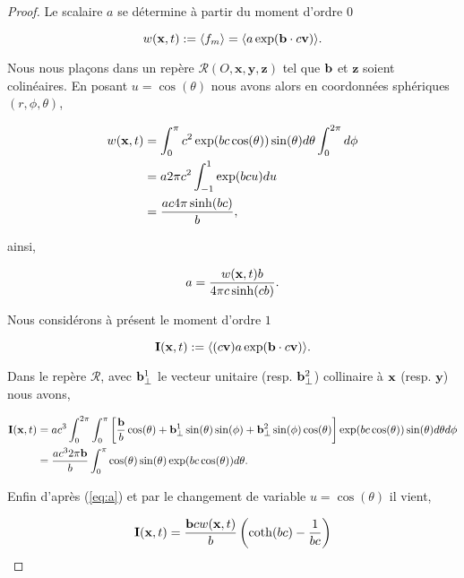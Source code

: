 \begin{proof}

  Le scalaire $a$ se détermine à partir du moment d'ordre $0$

  $$
    w(\mathbf{x},t) := \langle f_m \rangle = \langle a \exp( \mathbf{b} \cdot c\mathbf{v}) \rangle.
  $$

  Nous nous plaçons dans un repère $\mathcal{R}(O,\mathbf{x},\mathbf{y},\mathbf{z})$ 
  tel que $\mathbf{b}$ et $\mathbf{z}$ soient colinéaires. En posant $u = \cos(\theta)$ 
  nous avons alors en coordonnées sphériques $(r,\phi,\theta)$,

  \begin{equation}
    \begin{aligned}
    w(\mathbf{x},t) &= \int_0^\pi c^2\exp(b c\cos(\theta)) 
    \sin(\theta) d\theta \int_0^{2\pi} d\phi \\ 
    &= a 2\pi c^2  \int_{-1}^1 \exp(bcu)du\\
    &=  \frac{a c 4\pi \sinh(bc)}{b},
    \end{aligned}
  \end{equation}

  ainsi,

  \begin{equation}
    \label{eq:a}
    a = \frac{w(\mathbf{x},t) b}{4 \pi c \sinh(cb)}.
  \end{equation}


  Nous considérons à présent le moment d'ordre $1$

  $$
  \mathbf{I}(\mathbf{x},t) :=  \langle   (c \mathbf{v}) a\exp(\mathbf{b} \cdot c\mathbf{v})  \rangle.
  $$

  Dans le repère $\mathcal{R}$, avec $\mathbf{b}_{\perp}^1$ le vecteur unitaire
  (resp. $\mathbf{b}_{\perp}^2$) collinaire à $\mathbf{x}$ (resp. $\mathbf{y}$) nous avons,
  
  \begin{equation}
    \begin{aligned}
    \mathbf{I}(\mathbf{x},t) &=a c^3\int_0^{2 \pi} \int_0^\pi  \left[  \frac{\mathbf{b}}{b} \cos(\theta) 
    + \mathbf{b}_{\perp}^1 \sin(\theta) \sin(\phi) 
    + \mathbf{b}_{\perp}^2 \sin(\phi) \cos(\theta)\right]\exp(bc\cos(\theta)) 
    \sin(\theta) d \theta d \phi \\
    & = \frac{a c^3 2\pi \mathbf{b}}{b}  \int_0^\pi \cos(\theta)\sin(\theta) 
    \exp(bc\cos(\theta)) d \theta.
    \end{aligned}
  \end{equation}

  Enfin d'après (\ref{eq:a}) et par le changement de variable $u = \cos(\theta)$ 
  il vient,

  \begin{equation}
  \label{eq:ifuncb}
    \mathbf{I}(\mathbf{x},t) = \frac{\mathbf{b} c w(\mathbf{x},t)}{b}  \left(\coth(bc)  - \frac{1}{bc} \right)
  \end{equation}

\end{proof}

